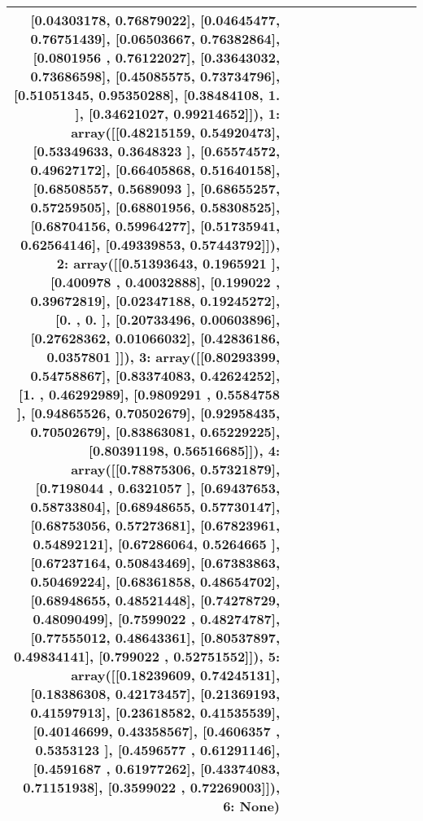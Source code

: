 \begin{tabular}{rrrlrrrrlll}
{       [0.04303178, 0.76879022],
       [0.04645477, 0.76751439],
       [0.06503667, 0.76382864],
       [0.0801956 , 0.76122027],
       [0.33643032, 0.73686598],
       [0.45085575, 0.73734796],
       [0.51051345, 0.95350288],
       [0.38484108, 1.        ],
       [0.34621027, 0.99214652]]), 1: array([[0.48215159, 0.54920473],
       [0.53349633, 0.3648323 ],
       [0.65574572, 0.49627172],
       [0.66405868, 0.51640158],
       [0.68508557, 0.5689093 ],
       [0.68655257, 0.57259505],
       [0.68801956, 0.58308525],
       [0.68704156, 0.59964277],
       [0.51735941, 0.62564146],
       [0.49339853, 0.57443792]]), 2: array([[0.51393643, 0.1965921 ],
       [0.400978  , 0.40032888],
       [0.199022  , 0.39672819],
       [0.02347188, 0.19245272],
       [0.        , 0.        ],
       [0.20733496, 0.00603896],
       [0.27628362, 0.01066032],
       [0.42836186, 0.0357801 ]]), 3: array([[0.80293399, 0.54758867],
       [0.83374083, 0.42624252],
       [1.        , 0.46292989],
       [0.9809291 , 0.5584758 ],
       [0.94865526, 0.70502679],
       [0.92958435, 0.70502679],
       [0.83863081, 0.65229225],
       [0.80391198, 0.56516685]]), 4: array([[0.78875306, 0.57321879],
       [0.7198044 , 0.6321057 ],
       [0.69437653, 0.58733804],
       [0.68948655, 0.57730147],
       [0.68753056, 0.57273681],
       [0.67823961, 0.54892121],
       [0.67286064, 0.5264665 ],
       [0.67237164, 0.50843469],
       [0.67383863, 0.50469224],
       [0.68361858, 0.48654702],
       [0.68948655, 0.48521448],
       [0.74278729, 0.48090499],
       [0.7599022 , 0.48274787],
       [0.77555012, 0.48643361],
       [0.80537897, 0.49834141],
       [0.799022  , 0.52751552]]), 5: array([[0.18239609, 0.74245131],
       [0.18386308, 0.42173457],
       [0.21369193, 0.41597913],
       [0.23618582, 0.41535539],
       [0.40146699, 0.43358567],
       [0.4606357 , 0.5353123 ],
       [0.4596577 , 0.61291146],
       [0.4591687 , 0.61977262],
       [0.43374083, 0.71151938],
       [0.3599022 , 0.72269003]]), 6: None}) \\
\bottomrule
\end{tabular}
